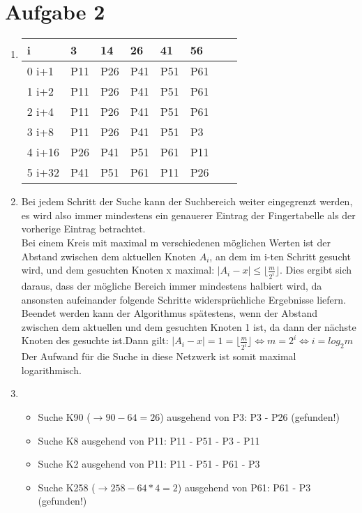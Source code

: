 \documentclass[a4paper, landscape]{article}
\begin{document}
\section*{Aufgabe 2}
\begin{enumerate}[label=\alph*)]
\item 
\begin{tabular}{| l | l | l | l | l | l | l | l |}
\hline 
i & 3 & 14 & 26 & 41 & 56\\
\hline
\hline
0 i+1 & P11 & P26 & P41 & P51 & P61\\
1 i+2 & P11 & P26 & P41 & P51 & P61\\
2 i+4 & P11 & P26 & P41 & P51 & P61\\
3 i+8 & P11 & P26 & P41 & P51 & P3\\
4 i+16 & P26 & P41 & P51 & P61 & P11\\
5 i+32 & P41 & P51 & P61 & P11 & P26\\
\hline
\end{tabular}

\item 
Bei jedem Schritt der Suche kann der Suchbereich weiter eingegrenzt werden, es wird also immer mindestens ein genauerer Eintrag der Fingertabelle als der vorherige Eintrag betrachtet. \\
Bei einem Kreis mit maximal m verschiedenen möglichen Werten ist der Abstand zwischen dem aktuellen Knoten $ A_i $, an dem im i-ten Schritt gesucht wird, und dem gesuchten Knoten x maximal: $ \vert A_i-x \vert \leq \lfloor \frac{m}{2^i} \rfloor $. Dies ergibt sich daraus, dass der mögliche Bereich immer mindestens halbiert wird, da ansonsten aufeinander folgende Schritte widersprüchliche Ergebnisse liefern. \\
Beendet werden kann der Algorithmus spätestens, wenn der Abstand zwischen dem aktuellen und dem gesuchten Knoten 1 ist, da dann der nächste Knoten des gesuchte ist.Dann gilt: $ \vert A_i-x \vert = 1 = \lfloor \frac{m}{2^i} \rfloor \Leftrightarrow m = 2^i \Leftrightarrow i = log_2 m $\\
Der Aufwand für die Suche in diese Netzwerk ist somit maximal logarithmisch.

\item 
\begin{itemize}
\item Suche K90 ($ \rightarrow 90-64 = 26 $) ausgehend von P3: P3 - P26 (gefunden!) 
\item Suche K8 ausgehend von P11: P11 - P51 - P3 - P11
\item Suche K2 ausgehend von P11: P11 - P51 - P61 - P3
\item Suche K258 ($ \rightarrow 258-64*4 = 2 $) ausgehend von P61: P61 - P3 (gefunden!) 
\end{itemize}


\end{enumerate}
\end{document}
